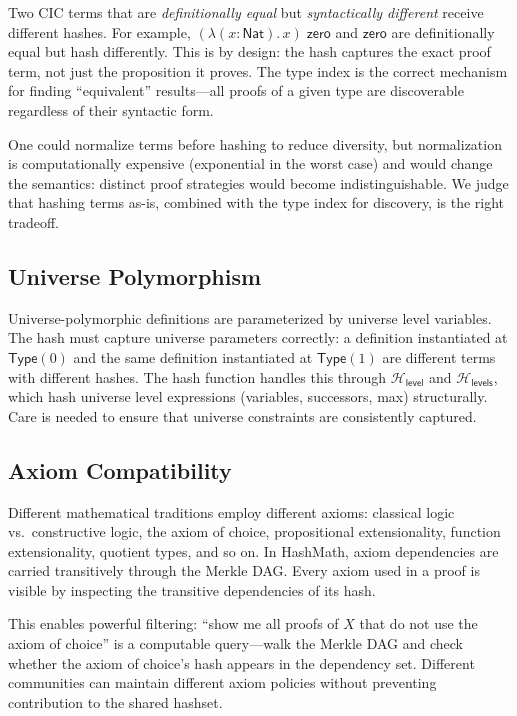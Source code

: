 \documentclass[11pt]{article}
\theoremstyle{definition}
\theoremstyle{plain}
\theoremstyle{remark}
\newcommand{\hash}{\mathcal{H}}
\newcommand{\Type}{\textsf{Type}}
\newcommand{\Nat}{\textsf{Nat}}
\begin{document}
Two CIC terms that are \emph{definitionally equal} but \emph{syntactically different}
receive different hashes.
For example, $(\lambda(x{:}\Nat).\,x)\;\textsf{zero}$ and $\textsf{zero}$ are definitionally
equal but hash differently.
This is by design: the hash captures the exact proof term, not just the proposition it proves.
The type index is the correct mechanism for finding ``equivalent'' results---all proofs of a
given type are discoverable regardless of their syntactic form.

One could normalize terms before hashing to reduce diversity, but normalization is computationally
expensive (exponential in the worst case) and would change the semantics: distinct proof strategies
would become indistinguishable.
We judge that hashing terms as-is, combined with the type index for discovery, is the right tradeoff.

\subsection{Universe Polymorphism}
\label{sec:hash-universes}

Universe-polymorphic definitions are parameterized by universe level variables.
The hash must capture universe parameters correctly: a definition instantiated at $\Type(0)$
and the same definition instantiated at $\Type(1)$ are different terms with different hashes.
The hash function handles this through $\hash_{\textsf{level}}$ and $\hash_{\textsf{levels}}$,
which hash universe level expressions (variables, successors, max) structurally.
Care is needed to ensure that universe constraints are consistently captured.

\subsection{Axiom Compatibility}
\label{sec:axioms}

Different mathematical traditions employ different axioms: classical logic vs.\ constructive logic,
the axiom of choice, propositional extensionality, function extensionality, quotient types, and so on.
In HashMath, axiom dependencies are carried transitively through the Merkle DAG.
Every axiom used in a proof is visible by inspecting the transitive dependencies of its hash.

This enables powerful filtering: ``show me all proofs of $X$ that do not use the axiom of
choice'' is a computable query---walk the Merkle DAG and check whether the axiom of choice's
hash appears in the dependency set.
Different communities can maintain different axiom policies without preventing contribution
to the shared hashset.
\end{document}
